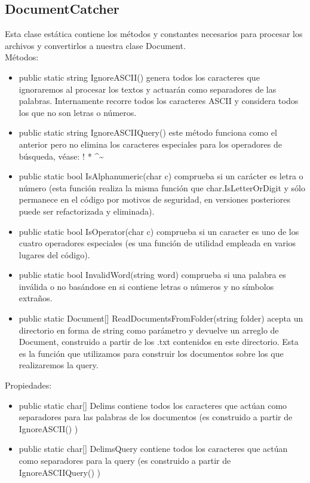 \documentclass[a4paper,12pt]{article}
\begin{document}
\subsection{DocumentCatcher}\label{sub:doc-catcher}
Esta clase estática contiene los métodos y constantes necesarios para procesar los
archivos y convertirlos a nuestra clase Document.
\\
\newline Métodos:
\begin{itemize}
    \item public static string IgnoreASCII() genera todos los caracteres que ignoraremos al procesar los textos y
    actuarán como separadores de las palabras. Internamente recorre todos los caracteres
    ASCII y considera todos los que no son letras o números.
    \item public static string IgnoreASCIIQuery() este método funciona como el anterior pero no elimina los
    caracteres especiales para los operadores de búsqueda, véase: ! * \textasciicircum \textasciitilde
    \item public static bool IsAlphanumeric(char c) comprueba si un carácter es letra o número (esta función realiza la
    misma función que char.IsLetterOrDigit y sólo permanece en el código por motivos de
    seguridad, en versiones posteriores puede ser refactorizada y eliminada).
    \item public static bool IsOperator(char c) comprueba si un caracter es uno de los cuatro operadores especiales (es una
    función de utilidad empleada en varios lugares del código).
    \item public static bool InvalidWord(string word) comprueba si una palabra es inválida o no basándose en si contiene letras
    o números y no símbolos extraños.
    \item public static Document[] ReadDocumentsFromFolder(string folder) acepta un directorio en forma de string como parámetro y
    devuelve un arreglo de Document, construido a partir de los .txt contenidos en este
    directorio. Esta es la función que utilizamos para construir los documentos sobre los que
    realizaremos la query.
\end{itemize}

Propiedades:
\begin{itemize}
    \item public static char[] Delims contiene todos los caracteres que actúan como separadores para las palabras de
    los documentos (es construido a partir de IgnoreASCII() )
    \item public static char[] DelimsQuery contiene todos los caracteres que actúan como separadores para la query
    (es construido a partir de IgnoreASCIIQuery() )
\end{itemize}
\end{document}
